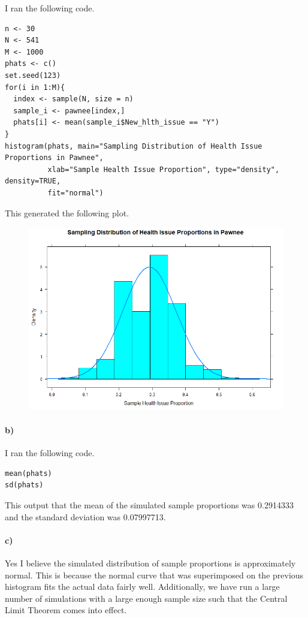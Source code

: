 \documentclass[12pt]{article}
\begin{document}
I ran the following code.
\scriptsize
\begin{verbatim}
n <- 30
N <- 541
M <- 1000
phats <- c()
set.seed(123)
for(i in 1:M){
  index <- sample(N, size = n)
  sample_i <- pawnee[index,]
  phats[i] <- mean(sample_i$New_hlth_issue == "Y")
}
histogram(phats, main="Sampling Distribution of Health Issue Proportions in Pawnee",
          xlab="Sample Health Issue Proportion", type="density", density=TRUE,
          fit="normal")
\end{verbatim}
\normalsize
This generated the following plot.
\begin{figure}[H]
    \begin{center}
        \includegraphics[width=4.5in]{exercise2a.png}
    \end{center}
\end{figure}

\paragraph{b)}

I ran the following code.
\begin{verbatim}
mean(phats)
sd(phats)
\end{verbatim}
This output that the mean of the simulated sample proportions was 0.2914333
and the standard deviation was 0.07997713.

\paragraph{c)}

Yes I believe the simulated distribution of sample proportions is approximately
normal. This is because the normal curve that was superimposed on the previous
histogram fits the actual data fairly well. Additionally, we have run a large
number of simulations with a large enough sample size such that the Central
Limit Theorem comes into effect.
\end{document}
